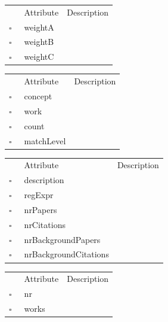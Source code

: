 \begin{table}
\caption{ConceptType  }

\begin{longtable}{llp{8cm}}
& Attribute & Description \\
$\square$\ & weightA &  \\
$\square$\ & weightB &  \\
$\square$\ & weightC &  \\
\end{longtable}
\label{attr:ConceptType}
\end{table}

\clearpage
\begin{table}
\caption{ConceptWork  }

\begin{longtable}{llp{8cm}}
& Attribute & Description \\
$\square$\ & concept &  \\
$\square$\ & work &  \\
$\square$\ & count &  \\
$\square$\ & matchLevel &  \\
\end{longtable}
\label{attr:ConceptWork}
\end{table}

\begin{table}
\caption{ConferenceSeries  }

\begin{longtable}{llp{8cm}}
& Attribute & Description \\
$\square$\ & description &  \\
$\square$\ & regExpr &  \\
$\square$\ & nrPapers &  \\
$\square$\ & nrCitations &  \\
$\square$\ & nrBackgroundPapers &  \\
$\square$\ & nrBackgroundCitations &  \\
\end{longtable}
\label{attr:ConferenceSeries}
\end{table}

\begin{table}
\caption{ConnectedComponent  }

\begin{longtable}{llp{8cm}}
& Attribute & Description \\
$\square$\ & nr &  \\
$\square$\ & works &  \\
\end{longtable}
\label{attr:ConnectedComponent}
\end{table}

